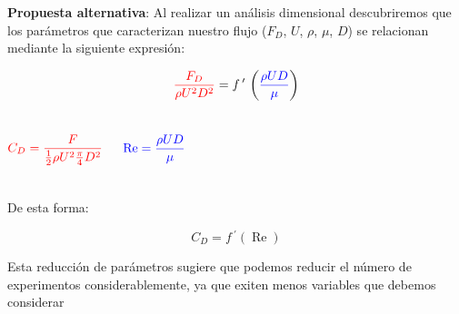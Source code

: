 \documentclass[t]{beamer}
\begin{document}
\begin{frame}[t]
\begin{small}

\textbf{Propuesta alternativa}: Al realizar un análisis dimensional descubriremos que los parámetros que caracterizan nuestro flujo ($F_D$, $U$, $\rho$, $\mu$, $D$) se relacionan mediante la siguiente expresión:

$${\color{red}{\frac{F_D}{\rho U^2 D^2}}} = f\,^\prime\,\left({\color{blue}{\frac{\rho U D}{\mu}}}\right)$$

\begin{columns}[T]
{\color{red}{Si multiplicamos el término en rojo por $8\pi$ obtendremos el coeficiente de arrastre $C_D$ (que corresponde a un grupo adimensional):}}

$$
\color{red}{C_{D}=\frac{F}{\frac{1}{2} \rho U^{2} \frac{\pi}{4} D^{2}}}
$$


{\color{blue}{El término en azul corresponde al número de Reynolds:}}

$$\color{blue}{\operatorname{Re}= \frac{\rho U D}{\mu}}$$
\end{columns}
De esta forma:


$$C_D = f\,^\prime(\operatorname{Re})$$


\begin{center}
\textbf{\color{red}{¡Hemos reducido nuestro problema a dos parámetros!}}
\end{center}
\end{small}

\begin{footnotesize}
Esta reducción de parámetros sugiere que podemos reducir el número de experimentos considerablemente, ya que exiten menos variables que debemos considerar
\end{footnotesize}
\end{frame}
\end{document}
